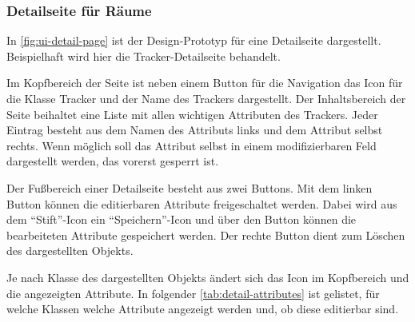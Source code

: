 \subsubsection{Detailseite für Räume} \label{sec:app-room}
In \autoref{fig:ui-detail-page} ist der Design-Prototyp für eine Detailseite dargestellt.
Beispielhaft wird hier die Tracker-Detailseite behandelt.

Im Kopfbereich der Seite ist neben einem Button für die Navigation das Icon für die Klasse Tracker und der Name des Trackers dargestellt.
Der Inhaltsbereich der Seite beihaltet eine Liste mit allen wichtigen Attributen des Trackers.
Jeder Eintrag besteht aus dem Namen des Attributs links und dem Attribut selbst rechts.
Wenn möglich soll das Attribut selbst in einem modifizierbaren Feld dargestellt werden, das vorerst gesperrt ist.

Der Fußbereich einer Detailseite besteht aus zwei Buttons.
Mit dem linken Button können die editierbaren Attribute freigeschaltet werden.
Dabei wird aus dem \enquote{Stift}-Icon ein \enquote{Speichern}-Icon und über den Button können die bearbeiteten Attribute gespeichert werden.
Der rechte Button dient zum Löschen des dargestellten Objekts.

Je nach Klasse des dargestellten Objekts ändert sich das Icon im Kopfbereich und die angezeigten Attribute.
In folgender \autoref{tab:detail-attributes} ist gelistet, für welche Klassen welche Attribute angezeigt werden und, ob diese editierbar sind.

